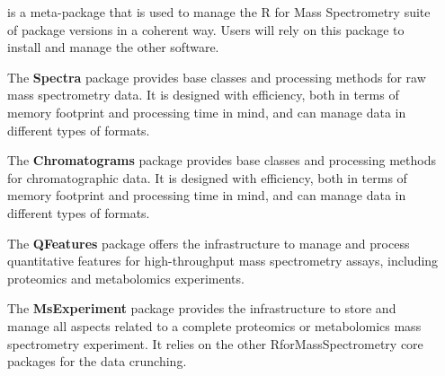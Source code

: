 \documentclass[final]{beamer}
\newcommand{\bpkg}[1]{{\textbf{#1}}}
\begin{document}
\begin{frame}[fragile]
\begin{columns}[T]
\begin{column}{.2\textwidth}
    \end{column}

    \begin{column}{.4\textwidth}

      \begin{block}{}
        \justifying \bpkg{RforMassSpectrometry} is a meta-package that
        is used to manage the R for Mass Spectrometry suite of package
        versions in a coherent way. Users will rely on this package to
        install and manage the other software.
      \end{block}

      \vspace{1cm}

      \begin{block}{}
        \justifying The \bpkg{Spectra} package provides base classes
        and processing methods for raw mass spectrometry data. It is
        designed with efficiency, both in terms of memory footprint
        and processing time in mind, and can manage data in different
        types of formats.
      \end{block}

      \vspace{1cm}

      \begin{block}{}
        \justifying The \bpkg{Chromatograms} package provides base
        classes and processing methods for chromatographic data. It
        is designed with efficiency, both in terms of memory footprint
        and processing time in mind, and can manage data in different
        types of formats.
      \end{block}

      \vspace{1cm}

      \begin{block}{}
        \justifying The \bpkg{QFeatures} package offers the
        infrastructure to manage and process quantitative features for
        high-throughput mass spectrometry assays, including proteomics
        and metabolomics experiments.
      \end{block}

      \vspace{1cm}

      \begin{block}{}
        \justifying The \bpkg{MsExperiment} package provides the
        infrastructure to store and manage all aspects related to a
        complete proteomics or metabolomics mass spectrometry
        experiment. It relies on the other RforMassSpectrometry core
        packages for the data crunching.
      \end{block}


\end{column}
\end{columns}
\end{frame}
\end{document}
